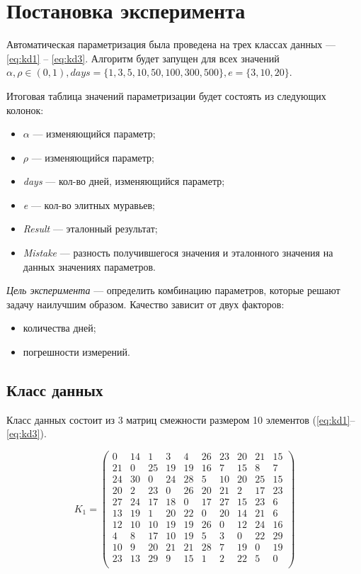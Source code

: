 \section{Постановка эксперимента}

Автоматическая параметризация была проведена на трех классах данных --- \ref{eq:kd1} -- \ref{eq:kd3}. Алгоритм будет запущен для всех значений $\alpha, \rho \in (0, 1), days = \{1, 3, 5, 10, 50, 100, 300, 500\}, e = \{3, 10, 20\}$.

Итоговая таблица значений параметризации будет состоять из следующих колонок:
\begin{itemize}
    \item $\alpha$ --- изменяющийся параметр;
    \item $\rho$ --- изменяющийся параметр;
    \item \textit{days} --- кол-во дней, изменяющийся параметр;
    \item \textit{e} --- кол-во элитных муравьев;
    \item \textit{Result} --- эталонный результат;
    \item \textit{Mistake} --- разность получившегося значения и эталонного значения на данных значениях параметров.
\end{itemize}

\textit{Цель эксперимента} --- определить комбинацию параметров, которые решают задачу наилучшим образом. Качество зависит от двух факторов:
\begin{itemize}
    \item количества дней;
    \item погрешности измерений.
\end{itemize}

\subsection{Класс данных}

Класс данных состоит из 3 матриц смежности размером 10 элементов (\ref{eq:kd1}--\ref{eq:kd3}).

\begin{equation}
    \label{eq:kd1}
	K_{1} = \begin{pmatrix}
		0 & 14 & 1 & 3 & 4 & 26 & 23 & 20 & 21 & 15 \\
		21 & 0 & 25 & 19 & 19 & 16 & 7 & 15 & 8 & 7 \\
		24 & 30 & 0 & 24 & 28 & 5 & 10 & 20 & 25 & 15 \\
		20 & 2 & 23 & 0 & 26 & 20 & 21 & 2 & 17 & 23 \\
		27 & 24 & 17 & 18 & 0 & 17 & 27 & 15 & 23 & 6 \\
		13 & 19 & 1 & 20 & 22 & 0 & 20 & 14 & 21 & 6 \\
		12 & 10 & 10 & 19 & 19 & 26 & 0 & 12 & 24 & 16 \\
		4 & 8 & 17 & 10 & 19 & 5 & 3 & 0 & 22 & 29 \\
		10 & 9 & 20 & 21 & 21 & 28 & 7 & 19 & 0 & 19 \\
		23 & 13 & 29 & 9 & 15 & 1 & 2 & 22 & 5 & 0 \\
	\end{pmatrix}
\end{equation}


